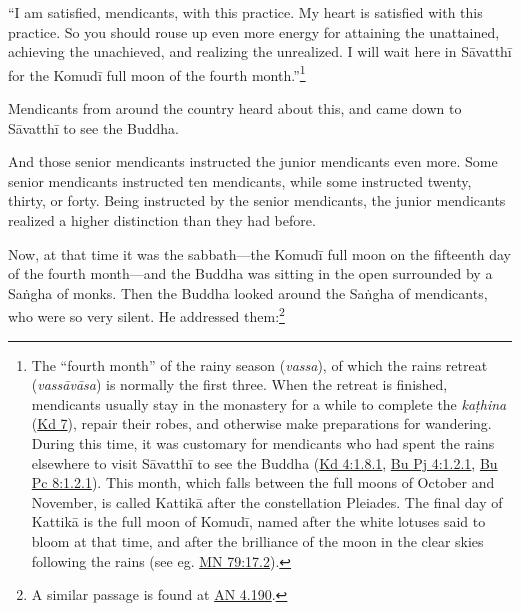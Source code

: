 \documentclass[12pt,openany]{book}%
\begin{document}
“I am satisfied, mendicants, with this practice. My heart is satisfied with this practice. So you should rouse up even more energy for attaining the unattained, achieving the unachieved, and realizing the unrealized. I will wait here in \textsanskrit{Sāvatthī} for the \textsanskrit{Komudī} full moon of the fourth month.”\footnote{The “fourth month” of the rainy season (\textit{vassa}), of which the rains retreat (\textit{\textsanskrit{vassāvāsa}}) is normally the first three. When the retreat is finished, mendicants usually stay in the monastery for a while to complete the \textit{\textsanskrit{kaṭhina}} (\href{https://suttacentral.net/pli-tv-kd7/en/sujato}{Kd 7}), repair their robes, and otherwise make preparations for wandering. During this time, it was customary for mendicants who had spent the rains elsewhere to visit \textsanskrit{Sāvatthī} to see the Buddha (\href{https://suttacentral.net/pli-tv-kd4/en/sujato\#1.8.1}{Kd 4:1.8.1}, \href{https://suttacentral.net/pli-tv-bu-vb-pj4/en/sujato\#1.2.1}{Bu Pj 4:1.2.1}, \href{https://suttacentral.net/pli-tv-bu-vb-pc8/en/sujato\#1.2.1}{Bu Pc 8:1.2.1}). This month, which falls between the full moons of October and November, is called \textsanskrit{Kattikā} after the constellation Pleiades. The final day of \textsanskrit{Kattikā} is the full moon of \textsanskrit{Komudī}, named after the white lotuses said to bloom at that time, and after the brilliance of the moon in the clear skies following the rains (see eg. \href{https://suttacentral.net/mn79/en/sujato\#17.2}{MN 79:17.2}). } 

Mendicants from around the country heard about this, and came down to \textsanskrit{Sāvatthī} to see the Buddha. 

And those senior mendicants instructed the junior mendicants even more. Some senior mendicants instructed ten mendicants, while some instructed twenty, thirty, or forty. Being instructed by the senior mendicants, the junior mendicants realized a higher distinction than they had before. 

Now, at that time it was the sabbath—the \textsanskrit{Komudī} full moon on the fifteenth day of the fourth month—and the Buddha was sitting in the open surrounded by a \textsanskrit{Saṅgha} of monks. Then the Buddha looked around the \textsanskrit{Saṅgha} of mendicants, who were so very silent. He addressed them:\footnote{A similar passage is found at \href{https://suttacentral.net/an4.190/en/sujato}{AN 4.190}. } 
\end{document}
